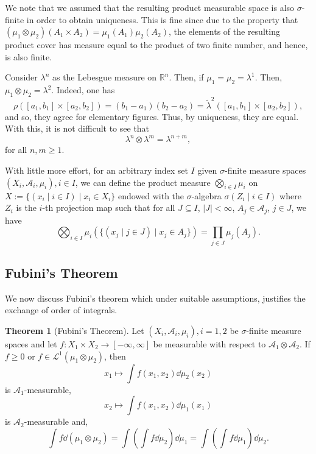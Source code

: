 \documentclass[
]{article}
\theoremstyle{definition}
\newtheorem{theorem}{Theorem}
\theoremstyle{definition}
\begin{document}
We note that we assumed that the resulting product measurable space is
also \(\sigma\)-finite in order to obtain uniqueness. This is fine since
due to the property that
\((\mu_1 \otimes \mu_2)(A_1 \times A_2) = \mu_1(A_1) \mu_2(A_2)\), the
elements of the resulting product cover has measure equal to the product
of two finite number, and hence, is also finite.

Consider \(\lambda^n\) as the Lebesgue measure on \(\mathbb{R}^n\).
Then, if \(\mu_1 = \mu_2 = \lambda^1\). Then,
\(\mu_1 \otimes \mu_2 = \lambda^2\). Indeed, one has
\[\rho([a_1, b_1] \times [a_2, b_2]) = (b_1 - a_1)(b_2 - a_2) 
  = \tilde \lambda^2([a_1, b_1] \times [a_2, b_2]),\] and so, they agree
for elementary figures. Thus, by uniqueness, they are equal. With this,
it is not difficult to see that
\[\lambda^n \otimes \lambda^m = \lambda^{n + m},\] for all
\(n, m \ge 1\).

With little more effort, for an arbitrary index set \(I\) given
\(\sigma\)-finite measure spaces
\((X_i, \mathcal{A}_i, \mu_i), i \in I\), we can define the product
measure \(\bigotimes_{i \in I} \mu_i\) on
\(X := \{(x_i \mid i \in I) \mid x_i \in X_i\}\) endowed with the
\(\sigma\)-algebra \(\sigma(Z_i \mid i \in I)\) where \(Z_i\) is the
\(i\)-th projection map such that for all \(J \subseteq I\),
\(|J| < \infty\), \(A_j \in \mathcal{A}_j\), \(j \in J\), we have
\[\bigotimes_{i \in I}\mu_i(\{(x_j \mid j \in J) \mid x_j \in A_j\}) 
  = \prod_{j \in J} \mu_j(A_j).\]

\hypertarget{fubinis-theorem}{%
\subsection{Fubini's Theorem}\label{fubinis-theorem}}

We now discuss Fubini's theorem which under suitable assumptions,
justifies the exchange of order of integrals.

\begin{theorem}[Fubini's Theorem]
  Let \((X_i, \mathcal{A}_i, \mu_i), i = 1, 2\) be \(\sigma\)-finite measure spaces 
  and let \(f : X_1 \times X_2 \to [-\infty, \infty]\) be measurable with respect 
  to \(\mathcal{A}_1 \otimes \mathcal{A}_2\). If \(f \ge 0\) or 
  \(f \in \mathcal{L}^{1}(\mu_1 \otimes \mu_2)\), then 
  \[x_1 \mapsto \int f(x_1, x_2) \dd \mu_2(x_2)\]
  is \(\mathcal{A}_1\)-measurable,
  \[x_2 \mapsto \int f(x_1, x_2) \dd \mu_1(x_1)\]
  is \(\mathcal{A}_2\)-measurable and,
  \[\int f \dd (\mu_1 \otimes \mu_2) = 
    \int \left(\int f \dd \mu_2\right) \dd \mu_1 = 
    \int \left(\int f \dd \mu_1\right) \dd \mu_2.\]
\end{theorem}
\end{document}
